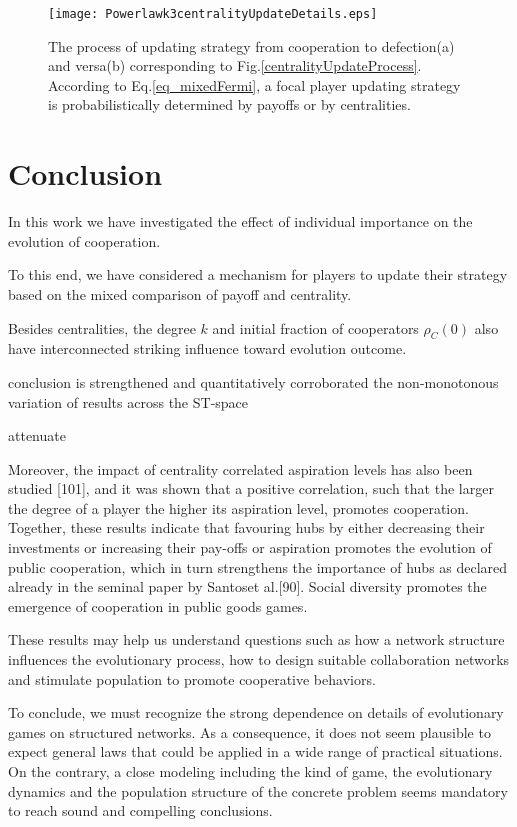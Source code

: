 \documentclass[preprint,12pt,3p]{elsarticle}
\begin{document}
\begin{figure}[htbp]
\centering
\texttt{[image: Powerlawk3centralityUpdateDetails.eps]}
\caption{The process of updating strategy from cooperation to defection(a) and versa(b)
corresponding to Fig.\ref{centralityUpdateProcess}.
According to Eq.\ref{eq_mixedFermi}, a focal player updating strategy is probabilistically
determined by payoffs or by centralities.
 }
\label{centralityUpdateProcessDetails}
\end{figure}

\section{Conclusion}

In this work we have investigated the effect of individual importance on the evolution of cooperation.

To this end, we have considered a mechanism for players to update their strategy based on
the mixed comparison of payoff and centrality.


Besides centralities, the degree $k$ and initial fraction of cooperators $\rho_{C}(0)$
also have interconnected striking influence toward evolution outcome.

conclusion is strengthened and quantitatively corroborated
the non-monotonous variation of results across the ST-space

attenuate

Moreover, the impact of centrality correlated aspiration levels has also been studied [101], and it was shown that a positive correlation, such that the larger the degree of a player the higher its aspiration level, promotes cooperation. Together, these results indicate that favouring hubs by either decreasing their investments or increasing their pay-offs or aspiration promotes the evolution of public cooperation, which in turn strengthens the importance of hubs as declared already in the seminal paper by Santoset al.[90]. Social diversity promotes the emergence of cooperation in public goods games.

These results may help us understand questions such as how a network structure influences the evolutionary
process, how to design suitable collaboration networks and stimulate population to promote cooperative behaviors.

To conclude, we must recognize the strong dependence on details of evolutionary games on structured networks.
As a consequence, it does not seem plausible to expect general laws that could be applied in a wide range of practical situations.
On the contrary, a close modeling including the
kind of game, the evolutionary dynamics and the population structure of the concrete problem seems mandatory to reach sound and compelling conclusions.
\end{document}
